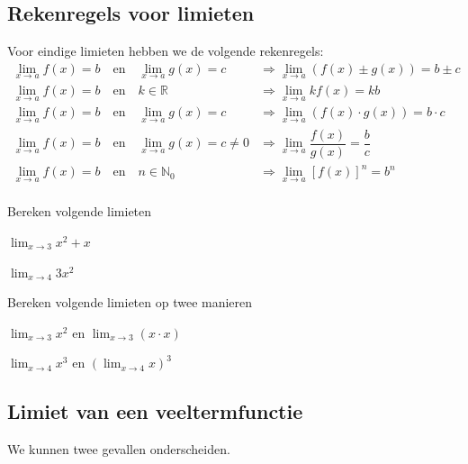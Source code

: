\documentclass[12pt,twoside,a4paper]{article}
\begin{document}
\subsection{Rekenregels voor limieten}

Voor eindige limieten hebben we de volgende rekenregels:
\begin{align*}
  \displaystyle\lim_{x\to a}f(x)=b\quad\mbox{en}\quad \lim_{x\to a}g(x)=c &\Rightarrow \lim_{x\to a}\left(f(x)\pm g(x)\right)=b\pm c\\
  \displaystyle\lim_{x\to a}f(x)=b\quad\mbox{en}\quad k\in\mathbb{R} &\Rightarrow \lim_{x\to a} kf(x)=kb\\
  \displaystyle\lim_{x\to a}f(x)=b\quad\mbox{en}\quad \lim_{x\to a}g(x)=c &\Rightarrow \lim_{x\to a}\left(f(x)\cdot g(x)\right)=b\cdot c\\
  \displaystyle\lim_{x\to a}f(x)=b\quad\mbox{en}\quad \lim_{x\to a}g(x)=c \neq 0 &\Rightarrow \lim_{x\to a}\dfrac{f(x)}{g(x)}=\dfrac{b}{c}\\
  \displaystyle\lim_{x\to a}f(x)=b\quad\mbox{en}\quad n\in\mathbb{N}_0 &\Rightarrow \lim_{x\to a} [f(x)]^n=b^n\\
\end{align*}

\begin{oefening}
  Bereken volgende limieten
  \begin{exlist}{2}
  \item $\displaystyle \lim_{x\to 3}x^2+x$
  \item $\displaystyle \lim_{x\to 4}3x^2$
  \end{exlist}
\end{oefening}

\begin{oefening}
  Bereken volgende limieten op twee manieren
  \begin{exlist}{2}
  \item $\displaystyle \lim_{x\to 3}x^2$ en $\displaystyle \lim_{x\to 3}\left(x\cdot x\right)$
  \item $\displaystyle \lim_{x\to 4}x^3$ en $\displaystyle \left(\lim_{x\to 4}x\right)^3$
  \end{exlist}
\end{oefening}

\needspace{4cm}
\subsection{Limiet van een veeltermfunctie}

We kunnen twee gevallen onderscheiden.
\end{document}
